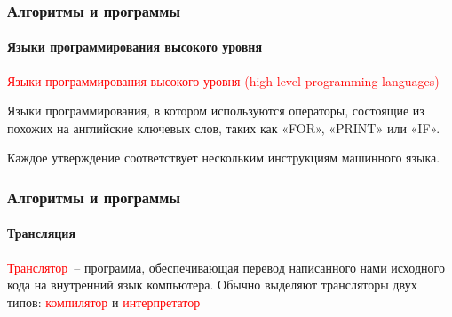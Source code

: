 \documentclass[aspectratio=169]{beamer}
\begin{document}
\begin{frame}
\frametitle{Алгоритмы и программы}
\framesubtitle{Языки программирования высокого уровня}
\justifying
\small

\textcolor{red}{Языки программирования высокого уровня (high-level programming languages)}\newline


Языки программирования, в котором используются операторы, состоящие из похожих на английские ключевых слов, таких как «FOR», «PRINT» или «IF».\newline

Каждое утверждение соответствует нескольким инструкциям машинного языка.\newline

\begin{figure}
    \captionsetup[subfigure]{labelformat=empty}
    \centering
\end{figure}
\end{frame}

\begin{frame}
\frametitle{Алгоритмы и программы}
\framesubtitle{Трансляция}
\justifying
\textcolor{red}{Транслятор} – программа, обеспечивающая перевод написанного нами исходного кода на внутренний язык компьютера. \newline\newline
Обычно выделяют трансляторы двух типов: \textcolor{red}{компилятор} и \textcolor{red}{интерпретатор}
\begin{figure}
    \captionsetup[subfigure]{labelformat=empty}
    \centering
\end{figure}
\end{frame}
\end{document}
